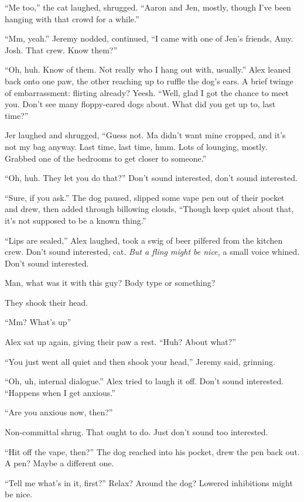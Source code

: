 \documentclass[12pt,letterpaper,oneside]{memoir}
\begin{document}
  ``Me too,'' the cat laughed, shrugged. ``Aaron and Jen, mostly, though
  I've been hanging with that crowd for a while.''

  ``Mm, yeah.'' Jeremy nodded, continued, ``I came with one of Jen's
  friends, Amy. Josh. That crew. Know them?''

  ``Oh, huh. Know of them. Not really who I hang out with, usually.'' Alex
  leaned back onto one paw, the other reaching up to ruffle the dog's
  ears. A brief twinge of embarrassment: flirting already? Yeesh. ``Well,
  glad I got the chance to meet you. Don't see many floppy-eared dogs
  about. What did you get up to, last time?''

  Jer laughed and shrugged, ``Guess not. Ma didn't want mine cropped, and
  it's not my bag anyway. Last time, last time, hmm. Lots of lounging,
  mostly. Grabbed one of the bedrooms to get closer to someone.''

  ``Oh, huh. They let you do that?'' Don't sound interested, don't sound
  interested.

  ``Sure, if you ask.'' The dog paused, slipped some vape pen out of their
  pocket and drew, then added through billowing clouds, ``Though keep
  quiet about that, it's not supposed to be a known thing.''

  ``Lips are sealed,'' Alex laughed, took a swig of beer pilfered from the
  kitchen crew. Don't sound interested, cat. \emph{But a fling might be
  nice,} a small voice whined. Don't sound interested.

  Man, what was it with this guy? Body type or something?

  They shook their head.

  ``Mm? What's up''

  Alex sat up again, giving their paw a rest. ``Huh? About what?''

  ``You just went all quiet and then shook your head,'' Jeremy said,
  grinning.

  ``Oh, uh, internal dialogue.'' Alex tried to laugh it off. Don't sound
  interested. ``Happens when I get anxious.''

  ``Are you anxious now, then?''

  Non-committal shrug. That ought to do. Just don't sound too interested.

  ``Hit off the vape, then?'' The dog reached into his pocket, drew the
  pen back out. A pen? Maybe a different one.

  ``Tell me what's in it, first?'' Relax? Around the dog? Lowered
  inhibitions might be nice.
\end{document}
